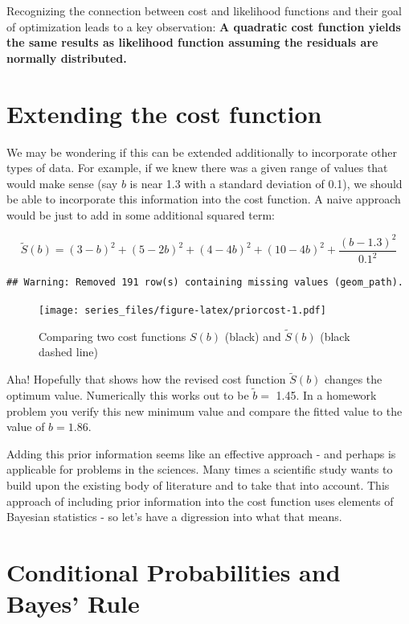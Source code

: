 \documentclass[
]{book}
\theoremstyle{definition}
\theoremstyle{definition}
\theoremstyle{definition}
\theoremstyle{remark}
\begin{document}
Recognizing the connection between cost and likelihood functions and their goal of optimization leads to a key observation: \textbf{A quadratic cost function yields the same results as likelihood function assuming the residuals are normally distributed.}

\hypertarget{extending-the-cost-function}{%
\section{Extending the cost function}\label{extending-the-cost-function}}

We may be wondering if this can be extended additionally to incorporate other types of data. For example, if we knew there was a given range of values that would make sense (say \(b\) is near 1.3 with a standard deviation of 0.1), we should be able to incorporate this information into the cost function. A naive approach would be just to add in some additional squared term:

\begin{equation}
\tilde{S}(b)=(3-b)^2+(5-2b)^2+(4-4b)^2+(10-4b)^2 + \frac{(b-1.3)^2}{0.1^2}
\end{equation}

\begin{verbatim}
## Warning: Removed 191 row(s) containing missing values (geom_path).
\end{verbatim}

\begin{figure}
\centering
\texttt{[image: series\_files/figure-latex/priorcost-1.pdf]}
\caption{\label{fig:priorcost}Comparing two cost functions \(S(b)\) (black) and \(\tilde{S}(b)\) (black dashed line)}
\end{figure}

Aha! Hopefully that shows how the revised cost function \(\tilde{S}(b)\) changes the optimum value. Numerically this works out to be \(\tilde{b}=\) 1.45. In a homework problem you verify this new minimum value and compare the fitted value to the value of \(b=1.86\).

Adding this prior information seems like an effective approach - and perhaps is applicable for problems in the sciences. Many times a scientific study wants to build upon the existing body of literature and to take that into account. This approach of including prior information into the cost function uses elements of Bayesian statistics - so let's have a digression into what that means.

\hypertarget{conditional-probabilities-and-bayes-rule}{%
\section{Conditional Probabilities and Bayes' Rule}\label{conditional-probabilities-and-bayes-rule}}
\end{document}
